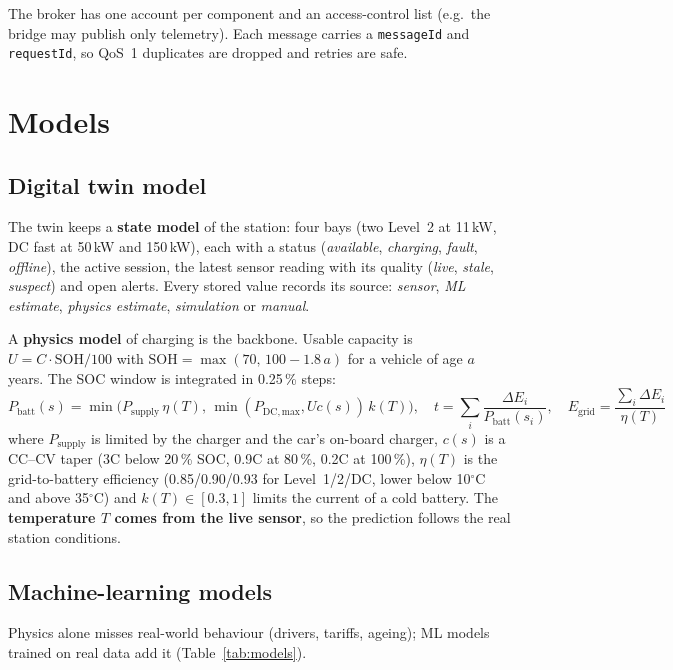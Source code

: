 \documentclass[11pt,a4paper]{article}
\newcommand{\degC}{\ensuremath{^\circ}C}
\begin{document}
The broker has one account per component and an access-control list (e.g.\ the bridge may publish only telemetry).
Each message carries a \texttt{messageId} and \texttt{requestId}, so QoS~1 duplicates are dropped and retries are safe.

\section{Models}
\subsection{Digital twin model}
The twin keeps a \textbf{state model} of the station: four bays (two Level~2 at 11\,kW, DC fast at 50\,kW and
150\,kW), each with a status (\emph{available}, \emph{charging}, \emph{fault}, \emph{offline}), the active session, the
latest sensor reading with its quality (\emph{live}, \emph{stale}, \emph{suspect}) and open alerts. Every stored value
records its source: \emph{sensor}, \emph{ML estimate}, \emph{physics estimate}, \emph{simulation} or \emph{manual}.

A \textbf{physics model} of charging is the backbone. Usable capacity is $U = C\cdot \mathrm{SOH}/100$ with
$\mathrm{SOH} = \max(70,\,100-1.8\,a)$ for a vehicle of age $a$ years. The SOC window is integrated in 0.25\,\% steps:
\begin{equation}
  P_\mathrm{batt}(s) = \min\!\big(P_\mathrm{supply}\,\eta(T),\, \min(P_\mathrm{DC,max},U c(s))\,k(T)\big),\quad
  t = \sum_i \frac{\Delta E_i}{P_\mathrm{batt}(s_i)},\quad E_\mathrm{grid} = \frac{\sum_i \Delta E_i}{\eta(T)}
\end{equation}
where $P_\mathrm{supply}$ is limited by the charger and the car's on-board charger, $c(s)$ is a CC--CV taper
(3C below 20\,\% SOC, 0.9C at 80\,\%, 0.2C at 100\,\%), $\eta(T)$ is the grid-to-battery efficiency (0.85/0.90/0.93
for Level~1/2/DC, lower below 10\degC{} and above 35\degC) and $k(T)\in[0.3,1]$ limits the current of a cold battery.
The \textbf{temperature $T$ comes from the live sensor}, so the prediction follows the real station conditions.

\subsection{Machine-learning models}
Physics alone misses real-world behaviour (drivers, tariffs, ageing); ML models trained on real data add it
(Table~\ref{tab:models}).
\end{document}

